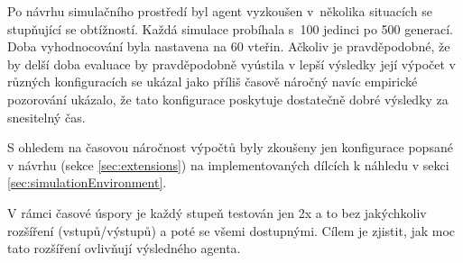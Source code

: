 Po návrhu simulačního prostředí byl agent vyzkoušen v~několika situacích se stupňující se obtížností. Každá simulace probíhala s~100 jedinci po 500 generací. Doba vyhodnocování byla nastavena na 60 vteřin. Ačkoliv je pravděpodobné, že by delší doba evaluace by pravděpodobně vyústila v lepší výsledky její výpočet v různých konfiguracích se ukázal jako příliš časově náročný navíc empirické pozorování ukázalo, že tato konfigurace poskytuje dostatečně dobré výsledky za snesitelný čas. 

S ohledem na časovou náročnost výpočtů byly zkoušeny jen konfigurace popsané v návrhu (sekce \ref{sec:extensions}) na implementovaných dílcích k náhledu v sekci \ref{sec:simulationEnvironment}.

V rámci časové úspory je každý stupeň testován jen 2x a to bez jakýchkoliv rozšíření (vstupů/výstupů) a poté se všemi dostupnými. Cílem je zjistit, jak moc tato rozšíření ovlivňují výsledného agenta.





